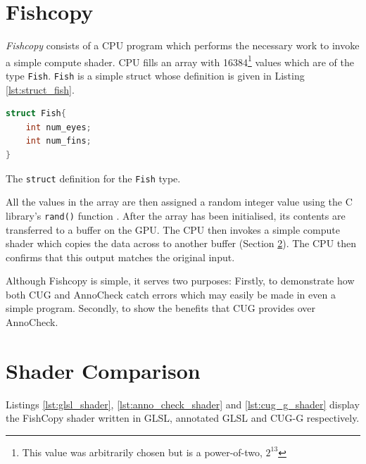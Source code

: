 \documentclass[a4paper,12pt,twoside,openright]{report}
\begin{document}
\section{Fishcopy}

\textit{Fishcopy} consists of a CPU program which performs the necessary work
to invoke a simple compute shader. CPU fills an array with 16384\footnote{This
value was arbitrarily chosen but is a power-of-two, $2^{13}$} values which are
of the type \texttt{Fish}. \texttt{Fish} is a simple struct whose definition is
given in Listing \ref{lst:struct_fish}.

\begin{lstfloat}
\begin{lstlisting}[language=C]
struct Fish{
    int num_eyes;
    int num_fins;
}
\end{lstlisting}
\caption{The \texttt{struct} definition for the \texttt{Fish} type.}
\label{lst:struct_fish}
\end{lstfloat}

All the values in the array are then assigned a random integer value using the
C library's \texttt{rand()} function \cite{RandRef}. After the array has been
initialised, its contents are transferred to a buffer on the GPU. The CPU then
invokes a simple compute shader which copies the data across to another buffer
(Section \ref{sec:shader_comparison}). The CPU then confirms that this output
matches the original input.

Although Fishcopy is simple, it serves two purposes: Firstly, to demonstrate
how both CUG and AnnoCheck catch errors which may easily be made in even a
simple program. Secondly, to show the benefits that CUG provides over
AnnoCheck.

\section{Shader Comparison}

\label{sec:shader_comparison}

Listings \ref{lst:glsl_shader}, \ref{lst:anno_check_shader} and
\ref{lst:cug_g_shader} display the FishCopy shader written in GLSL, annotated
GLSL and CUG-G respectively.
\end{document}
